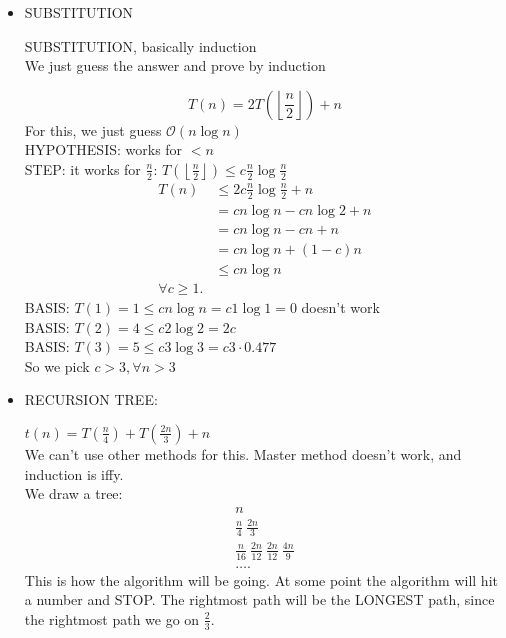 \begin{itemize}
\begin{example}
	\end{example}
\item SUBSTITUTION
	\begin{theorem}
		SUBSTITUTION, basically induction\\
		We just guess the answer and prove by induction
	\end{theorem}
	\begin{example}
		\begin{equation}
			T(n) = 2 T\left( \left\lfloor \frac{n}{2} \right\rfloor \right) + n
		\end{equation}
		For this, we just guess $\mathcal O \left( n \log n \right) $ \\
		HYPOTHESIS: works for $< n$\\
		STEP: it works for $\frac{n}{2}$: $T\left( \left\lfloor \frac{n}{2} \right\rfloor \right) \le c \frac{n}{2} \log \frac{n}{2}$\\
		\begin{align*}
			T\left( n \right)  & \le 2c \frac{n}{2} \log \frac{n}{2} + n\\
			&= cn\log n - cn \log 2 + n \\
			&= cn \log n - cn + n \\
			&= cn \log n + \left( 1-c \right) n \\
			& \le cn \log n\\
			\forall c \ge 1
		.\end{align*}
		BASIS: $T(1) = 1 \le  cn \log n = c 1 \log 1 = 0$ doesn't work\\
		BASIS: $T(2) = 4 \le  c 2 \log 2 = 2c$ \\
		BASIS: $T(3) = 5 \le  c 3 \log 3 = c 3 \cdot  0.477$\\
		So we pick $c > 3, \forall n > 3$
	\end{example}
\item RECURSION TREE:
	\begin{example}
		$t(n) = T\left( \frac{n}{4} \right) + T\left( \frac{2n}{3} \right) + n$ \\
		We can't use other methods for this. Master method doesn't work, and induction is iffy.\\
		We draw a tree:
		\begin{align*}
			n\\
			\frac{n}{4} ~\frac{2n}{3}\\
\frac{n}{16}~ \frac{2n}{12}~\frac{2n}{12}~\frac{4n}{9}\\
\ldots
		.\end{align*}
		This is how the algorithm will be going. At some point the algorithm will hit a number and STOP. The rightmost path will be the LONGEST path, since the rightmost path we go on $\frac{2}{3}$.\\

\end{example}
\end{itemize}

